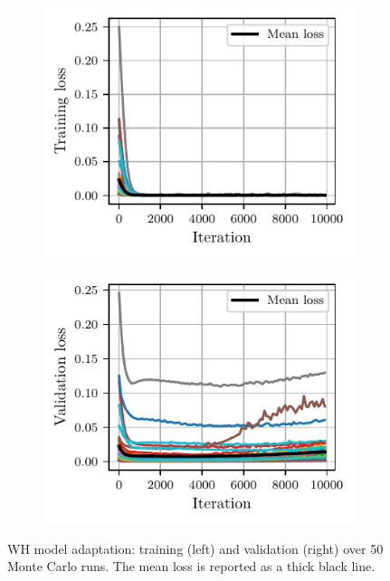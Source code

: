 \documentclass{ifacconf}
\begin{document}
\begin{figure}[t]
\begin{subfigure}{0.49\linewidth}
\includegraphics[width=\linewidth]{img/adaptation/wh_train_loss_new.pdf}
\label{fig:WH_model_adaptation}   
\end{subfigure}
\hfill
\begin{subfigure}{0.49\linewidth}
\includegraphics[width=\linewidth]{img/adaptation/wh_val_loss_new.pdf}
\label{WH_model_adaptation_train_loss}
\end{subfigure}
\caption{WH model adaptation: training (left) and validation (right) over 50 Monte Carlo runs. The mean loss   
is reported as a thick black line.}
\label{fig:WH_model_adaptation_loss}
\end{figure}
\end{document}
